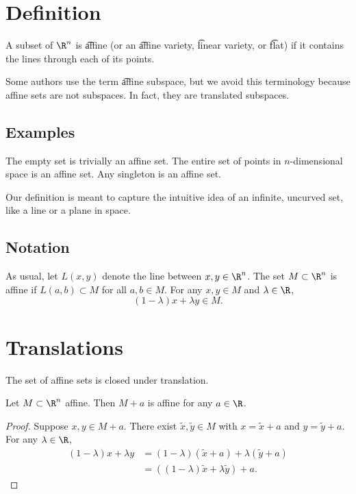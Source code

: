
\section*{Definition}

A subset of $\R ^n$ is \t{affine} (or an \t{affine variety}, \t{linear variety}, or \t{flat}) if it contains the lines through each of its points.

Some authors use the term \t{affine subspace}, but we avoid this terminology because affine sets are not subspaces.
In fact, they are translated subspaces.

\subsection*{Examples}

The empty set is trivially an affine set.
The entire set of points in $n$-dimensional space is an affine set.
Any singleton is an affine set.

Our definition is meant to capture the intuitive idea of an infinite, uncurved set, like a line or a plane in space.

\subsection*{Notation}

As usual, let $L(x, y)$ denote the line between $x, y \in \R ^n$.
The set $M \subset \R ^n$ is affine if $L(a, b) \subset M$ for all $a, b \in M$.
For any $x, y \in M$ and $\lambda  \in \R $,
  \[
(1-\lambda )x + \lambda y \in M.
  \]

\section*{Translations}

The set of affine sets is closed under translation.
\begin{proposition}Let $M \subset \R ^n$ affine.
Then $M + a$ is affine for any $a \in \R $.
\begin{proof}Suppose $x, y \in M+a$.
There exist $\tilde{x}, \tilde{y} \in M$ with $x = \tilde{x} + a$ and $y = \tilde{y} + a$.
For any $\lambda  \in \R $,
    \[
\begin{aligned}
(1-\lambda )x + \lambda y & = (1-\lambda )(\tilde{x} + a) + \lambda (\tilde{y} + a) \\
&= ((1-\lambda )\tilde{x} + \lambda \tilde{y}) + a.
\end{aligned}
    \]\end{proof}\end{proposition}

